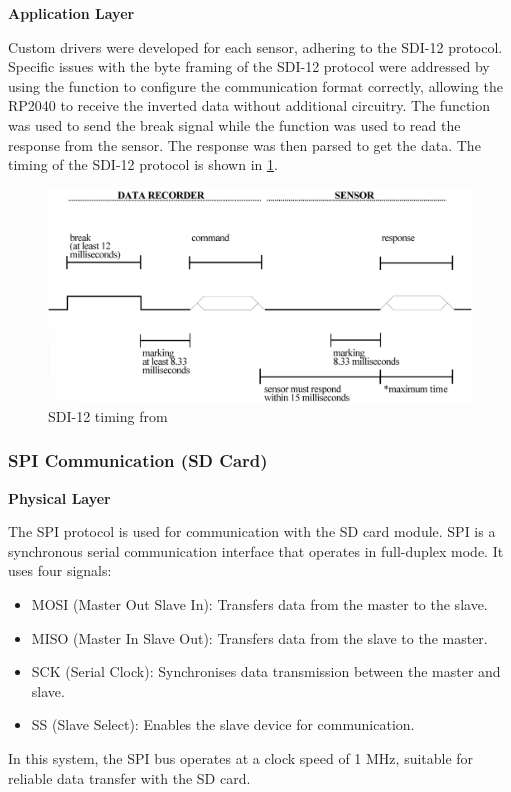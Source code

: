 \textbf{Application Layer}

Custom drivers were developed for each sensor, adhering to the SDI-12 
protocol. Specific issues with the byte framing of the SDI-12 protocol were addressed by using the 
 function to configure the communication format correctly, allowing the RP2040 
to receive the inverted data without additional circuitry. The  function was used to 
send the break signal while the  function was used to read the response from 
the sensor. The response was then parsed to get the data. The timing of the SDI-12 protocol is shown 
in \cref{sdi12_timing}.


\begin{figure}
    \includegraphics[width=\linewidth]{figures/SDI-12_timing.png}
    \caption{SDI-12 timing from \cite{sdi12_datasheet}}
    \label{sdi12_timing}
\end{figure}

\subsubsection{SPI Communication (SD Card)}

\textbf{Physical Layer}

The SPI protocol is used for communication with the SD card module. SPI is a synchronous serial communication 
interface that operates in full-duplex mode. It uses four signals:
\begin{itemize}
    \item MOSI (Master Out Slave In): Transfers data from the master to the slave.
    \item MISO (Master In Slave Out): Transfers data from the slave to the master.
    \item SCK (Serial Clock): Synchronises data transmission between the master and slave.
    \item SS (Slave Select): Enables the slave device for communication.
\end{itemize}
In this system, the SPI bus operates at a clock speed of 1 MHz, suitable for reliable data transfer 
with the SD card.

